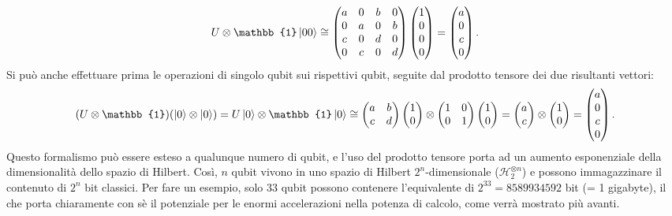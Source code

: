 \begin{equation} \label{eq:2.22}
    U\otimes\mathbb{1}\ket{00}\cong
    \begin{pmatrix}
        a&0&b&0\\
        0&a&0&b\\
        c&0&d&0\\
        0&c&0&d
    \end{pmatrix}
    \begin{pmatrix}
        1\\0\\0\\0
    \end{pmatrix}
    =
    \begin{pmatrix}
        a\\0\\c\\0
    \end{pmatrix}
    .
\end{equation}
Si può anche effettuare prima le operazioni di singolo qubit sui rispettivi 
qubit, seguite dal prodotto tensore dei due risultanti vettori: 
\begin{equation} \label{eq:2.23}
    (U\otimes\mathbb{1})(\ket{0}\otimes\ket{0}) = 
    U\ket{0}\otimes\mathbb{1}\ket{0} \cong 
    \begin{pmatrix}
        a&b\\c&d
    \end{pmatrix}
    \begin{pmatrix}
        1\\0
    \end{pmatrix}
    \otimes\Id
    \begin{pmatrix}
        1\\0
    \end{pmatrix}
    = 
    \begin{pmatrix}
        a\\c
    \end{pmatrix}
    \otimes
    \begin{pmatrix}
        1\\0
    \end{pmatrix}
    = 
    \begin{pmatrix}
        a\\0\\c\\0
    \end{pmatrix}
    .
\end{equation}
Questo formalismo può essere esteso a qualunque numero di qubit, e l'uso 
del prodotto tensore porta ad un aumento esponenziale della dimensionalità 
dello spazio di Hilbert. Così, $n$ qubit vivono in uno spazio di Hilbert 
$2^n$-dimensionale ($\mathcal{H}_2^{\otimes n}$) e possono immagazzinare 
il contenuto di $2^n$ bit classici. Per fare un esempio, solo 33 qubit 
possono contenere l'equivalente di $2^33 = 8589934592$ bit %
(= 1 gigabyte), il che porta chiaramente con sè il potenziale per le 
enormi accelerazioni nella potenza di calcolo, come verrà mostrato più avanti. 

